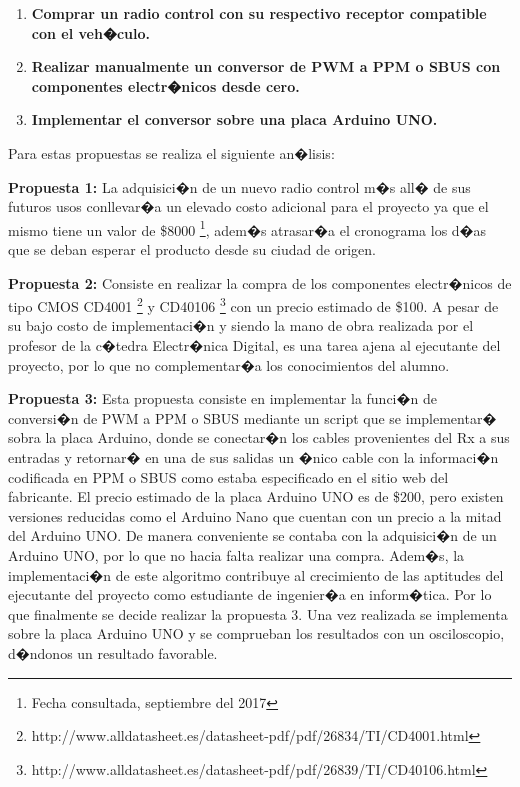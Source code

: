 		\begin{enumerate}
		\item \textbf{Comprar un radio control con su respectivo receptor compatible con el veh�culo.}   
		\item \textbf{Realizar manualmente un conversor de PWM a PPM o SBUS con componentes electr�nicos desde cero. }   
		\item \textbf{Implementar el conversor sobre una placa Arduino UNO.}   
		\end{enumerate}
		
		Para estas propuestas se realiza el siguiente an�lisis:\newline
		\par \textbf{Propuesta 1: } La adquisici�n de un nuevo radio control m�s all� de sus futuros usos conllevar�a un elevado costo adicional para el proyecto ya que el mismo tiene un valor de \$8000 \footnote{Fecha consultada, septiembre del 2017}, adem�s atrasar�a el cronograma los d�as que se deban esperar el producto desde su ciudad de origen.
		
		\par \textbf{Propuesta 2: } Consiste en realizar la compra de los componentes electr�nicos de tipo CMOS CD4001 \footnote{http://www.alldatasheet.es/datasheet-pdf/pdf/26834/TI/CD4001.html} y 	CD40106 \footnote{http://www.alldatasheet.es/datasheet-pdf/pdf/26839/TI/CD40106.html} con un precio estimado de \$100. A pesar de su bajo costo de implementaci�n y siendo la mano de obra realizada por el profesor de la c�tedra Electr�nica Digital, es una tarea ajena al ejecutante del proyecto, por lo que no complementar�a los conocimientos del alumno.
		
		\par \textbf{Propuesta 3: } Esta propuesta consiste en implementar la funci�n de conversi�n de PWM a PPM o SBUS mediante un script que se implementar� sobra la placa Arduino, donde se conectar�n los cables provenientes del Rx a sus entradas y retornar� en una de sus salidas un �nico cable con la informaci�n codificada en PPM o SBUS como estaba especificado en el sitio web del fabricante. El precio estimado de la placa Arduino UNO es de \$200, pero existen versiones reducidas como el Arduino Nano que cuentan con un precio a la mitad del Arduino UNO. De manera conveniente se contaba con la adquisici�n de un Arduino UNO, por lo que no hacia falta realizar una compra. Adem�s, la implementaci�n de este algoritmo contribuye al crecimiento de las aptitudes del ejecutante del proyecto como estudiante de ingenier�a en inform�tica. 
		Por lo que finalmente se decide realizar la propuesta 3. Una vez realizada se implementa sobre la placa Arduino UNO y se comprueban los resultados con un osciloscopio, d�ndonos un resultado favorable.




